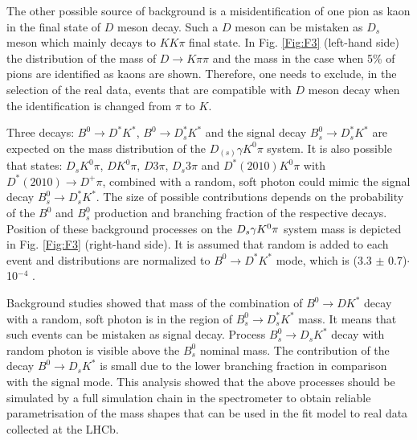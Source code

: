 \documentclass{appolb}
\begin{document}
The other possible source of background is a misidentification of one pion as kaon in the final state of $D$ meson decay. Such a $D$ meson can be mistaken as $D_s$ meson which mainly decays to $K K \pi$ final state. In Fig. \ref{Fig:F3} (left-hand side) the distribution of the mass of $D \rightarrow K \pi \pi$ and the mass in the case when 5\% of pions are identified as kaons are shown. Therefore, one needs to exclude, in the selection of the real data, events that are compatible with $D$ meson decay when the identification is changed from $\pi$  to $K$.  

Three decays: $B^0 \rightarrow D^* K^*$, $B^0 \rightarrow D^*_s K^*$ and the signal decay $B_s^0\rightarrow D^*_s K^*$ are expected on the mass distribution of the $D_{(s)} \gamma K^0 \pi$ system. It is also possible that states: $D_s K^0 \pi$, $D K^0 \pi$, $D 3\pi$, $D_s 3\pi$ and  $D^*(2010)K^0 \pi$ with $D^*(2010)\rightarrow D^+ \pi$, combined with a random, soft photon could mimic the signal decay $ B^0_s\rightarrow D^*_s K^*$. The size of possible contributions depends on the probability of the $B^0$ and $B^0_s$ production and branching fraction of the respective decays. Position of these background processes on the $D_s {\gamma} K^0 \pi$ system mass is depicted in Fig. \ref{Fig:F3} (right-hand side). It is assumed that random \g is added to each event and distributions are normalized to $B^0\rightarrow D^*K^*$ mode, which is (3.3 $\pm$ 0.7)$\cdot$10$^{-4}$ \cite{pdg_group}. 

Background studies showed that mass of the combination of  $B^0 \rightarrow DK^*$ decay with a random, soft photon is in the region of  $B_s^0 \rightarrow D^*_s K^*$ mass. It means that such events can be mistaken as signal decay. Process $B_s^0\rightarrow D_s K^*$ decay with random photon is visible above the $B^0_s$ nominal mass.
The contribution of the decay $B^0 \rightarrow D_sK^*$ is small
due to the lower branching fraction in comparison with the signal mode. This analysis showed that the above processes should be simulated by a full simulation chain in the spectrometer to obtain reliable parametrisation of the mass shapes that can be used in the fit model to real data collected at the LHCb.
\end{document}
